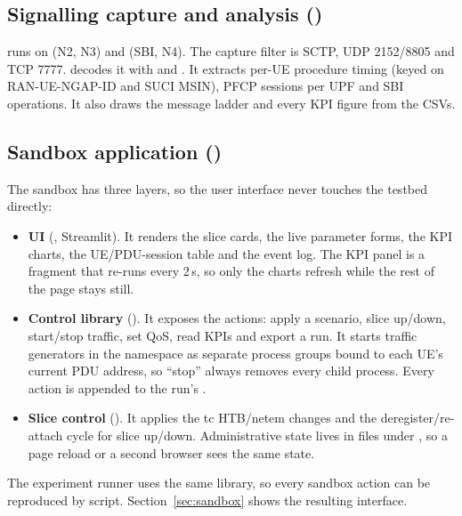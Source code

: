 \subsection{Signalling capture and analysis (\memberF)}
 runs  on  (N2, N3) and  (SBI, N4).
The capture filter is SCTP, UDP 2152/8805 and TCP 7777.  decodes it
with  and . It extracts per-UE
procedure timing (keyed on RAN-UE-NGAP-ID and SUCI MSIN), PFCP sessions per UPF and SBI
operations. It also draws the message ladder and every KPI figure from the CSVs.

\subsection{Sandbox application (\memberG)}
The sandbox has three layers, so the user interface never touches the testbed directly:
\begin{itemize}
\item \textbf{UI} (, Streamlit). It renders the slice cards, the live
  parameter forms, the KPI charts, the UE/PDU-session table and the event log. The KPI panel
  is a fragment that re-runs every 2\,s, so only the charts refresh while the rest of the
  page stays still.
\item \textbf{Control library} (). It exposes the actions: apply a
  scenario, slice up/down, start/stop traffic, set QoS, read KPIs and export a run. It starts
  traffic generators in the  namespace as separate process groups bound to each
  UE's current PDU address, so ``stop'' always removes every child process. Every action is
  appended to the run's .
\item \textbf{Slice control} (). It applies the tc HTB/netem
  changes and the deregister/re-attach cycle for slice up/down. Administrative state lives in
  files under , so a page reload or a second browser sees the same state.
\end{itemize}
The experiment runner uses the same library, so every sandbox action can be reproduced by
script. Section~\ref{sec:sandbox} shows the resulting interface.

